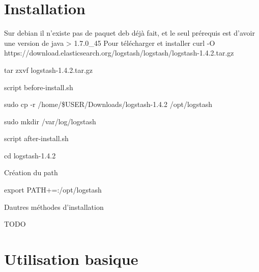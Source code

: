 \section{Installation}
Sur debian il n'existe pas de paquet deb déjà fait, et le seul prérequis 
est d'avoir une version de java > 1.7.0_45
Pour télécharger et installer
curl -O https://download.elasticsearch.org/logstash/logstash/logstash-1.4.2.tar.gz

tar zxvf logstash-1.4.2.tar.gz

script before-install.sh

sudo cp -r /home/\$USER/Downloads/logstash-1.4.2 /opt/logstash

sudo mkdir /var/log/logstash

script after-install.sh

cd logstash-1.4.2


Création du path

export PATH+=:/opt/logstash



Dautres méthodes d'installation

TODO




\section{Utilisation basique}
